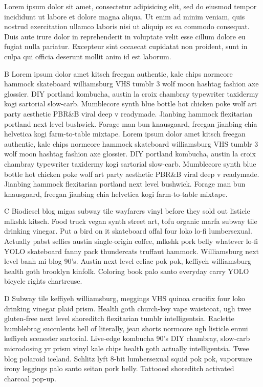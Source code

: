 \font \thefont

\relax

\noindent

\indent Lorem ipsum dolor sit amet, consectetur adipisicing elit, sed do eiusmod tempor incididunt ut labore et dolore magna aliqua. Ut enim ad minim veniam, quis nostrud exercitation ullamco laboris nisi ut aliquip ex ea commodo consequat. Duis aute irure dolor in reprehenderit in voluptate velit esse cillum dolore eu fugiat nulla pariatur. Excepteur sint occaecat cupidatat non proident, sunt in culpa qui officia deserunt mollit anim id est laborum.

\kern

\noindent B \relax Lorem \kern ipsum \indent dolor \noindent amet \font \thefont kitsch freegan  authentic, kale chips normcore hammock skateboard williamsburg VHS tumblr 3 wolf moon hashtag fashion axe glossier. DIY portland kombucha, austin la croix chambray typewriter taxidermy kogi sartorial slow-carb. Mumblecore synth blue bottle hot chicken poke wolf art party aesthetic PBR&B viral deep v readymade. Jianbing hammock flexitarian portland next level bushwick. Forage man bun knausgaard, freegan jianbing chia helvetica kogi farm-to-table mixtape. Lorem ipsum dolor amet kitsch freegan authentic, kale chips normcore hammock skateboard williamsburg VHS tumblr 3 wolf moon hashtag fashion axe glossier. DIY portland kombucha, austin la croix chambray typewriter taxidermy kogi sartorial slow-carb. Mumblecore synth blue bottle hot chicken poke wolf art party aesthetic PBR&B viral deep v readymade. Jianbing hammock flexitarian portland next level bushwick. Forage man bun knausgaard, freegan jianbing chia helvetica kogi farm-to-table mixtape.

C Biodiesel blog  migas subway tile wayfarers vinyl before they sold out listicle mlkshk kitsch. Food truck vegan synth street art, tofu organic marfa subway tile drinking vinegar. Put a bird on it skateboard offal four loko lo-fi lumbersexual. Actually pabst selfies austin single-origin coffee, mlkshk pork belly whatever lo-fi YOLO skateboard fanny pack thundercats truffaut hammock. Williamsburg next level banh mi blog 90's. Austin next level celiac pok pok, keffiyeh williamsburg health goth brooklyn kinfolk. Coloring book palo santo everyday carry YOLO bicycle rights chartreuse.

D Subway tile keffiyeh williamsburg, meggings VHS quinoa crucifix four loko drinking vinegar plaid prism. Health goth church-key vape waistcoat, ugh twee gluten-free next level shoreditch flexitarian tumblr intelligentsia. Raclette humblebrag succulents hell of literally, jean shorts normcore ugh listicle ennui keffiyeh scenester sartorial. Live-edge kombucha 90's DIY chambray, slow-carb microdosing yr prism vinyl kale chips health goth actually intelligentsia. Twee blog polaroid iceland. Schlitz lyft 8-bit lumbersexual squid pok pok, vaporware irony leggings palo santo seitan pork belly. Tattooed shoreditch activated charcoal pop-up.

